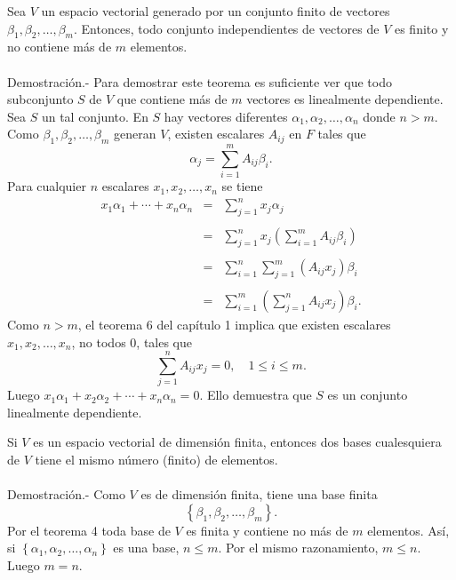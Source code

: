 \begin{teo}
    Sea $V$ un espacio vectorial generado por un conjunto finito de vectores $\beta_1,\beta_2,\ldots,\beta_m$. Entonces, todo conjunto independientes de vectores de $V$ es finito y no contiene más de $m$ elementos.\\\\
    Demostración.-\; Para demostrar este teorema es suficiente ver que todo subconjunto $S$ de $V$ que contiene más de $m$ vectores es linealmente dependiente. Sea $S$ un tal conjunto. En $S$ hay vectores diferentes $\alpha_1,\alpha_2,\ldots,\alpha_n$ donde $n>m$. Como $\beta_1,\beta_2,\ldots,\beta_m$ generan $V$, existen escalares $A_{ij}$ en $F$ tales que
    $$\alpha_j=\sum_{i=1}^m A_{ij}\beta_i.$$
    Para cualquier $n$ escalares $x_1,x_2,\ldots,x_n$ se tiene
    $$
    \begin{array}{rcl}
	x_1\alpha_1+\cdots+x_n\alpha_n &=& \displaystyle\sum_{j=1}^n x_j\alpha_j\\\\
				       &=& \displaystyle\sum_{j=1}^n x_j\left(\sum_{i=1}^m A_{ij}\beta_i\right)\\\\
				       &=&\displaystyle\sum_{i=1}^n\sum_{j=1}^m \left(A_{ij}x_j\right)\beta_i\\\\
	&=&\displaystyle\sum_{i=1}^m\left(\sum_{j=1}^n A_{ij}x_j\right)\beta_i.
    \end{array}
    $$
    Como $n>m$, el teorema 6 del capítulo 1 implica que existen escalares $x_1,x_2,\ldots,x_n$, no todos $0$, tales que
    $$\sum_{j=1}^nA_{ij}x_j=0,\quad 1\leq i \leq m.$$
    Luego $x_1\alpha_1+x_2\alpha_2+\cdots+x_n\alpha_n=0$. Ello demuestra que $S$ es un conjunto linealmente dependiente.
\end{teo}

\begin{cor}
    Si $V$ es un espacio vectorial de dimensión finita, entonces dos bases cualesquiera de $V$ tiene el mismo número (finito) de elementos.\\\\
	Demostración.-\; Como $V$ es de dimensión finita, tiene una base finita
	$$\left\{\beta_1,\beta_2,\ldots,\beta_m\right\}.$$
	Por el teorema 4 toda base de $V$ es finita y contiene no más de $m$ elementos. Así, si $\left\{\alpha_1,\alpha_2,\ldots,\alpha_n\right\}$ es una base, $n\leq m$. Por el mismo razonamiento, $m\leq n$. Luego $m=n$.
\end{cor}

